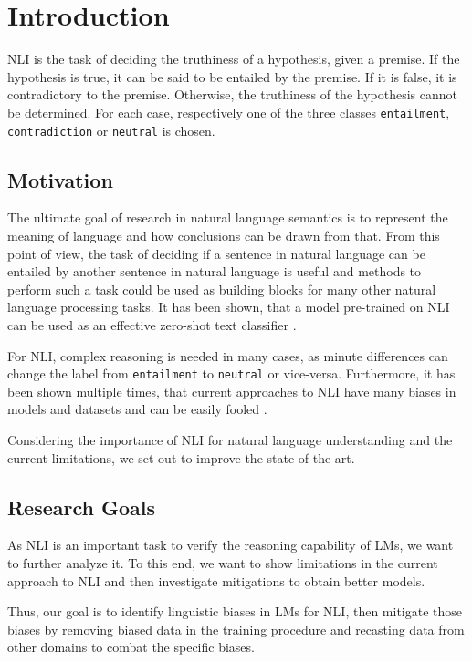 \section{Introduction}


\ac{NLI} is the task of deciding the truthiness of a hypothesis, given a premise. If the hypothesis is true, it can be said to be entailed by the premise. If it is false, it is contradictory to the premise. Otherwise, the truthiness of the hypothesis cannot be determined. For each case, respectively one of the three classes \texttt{entailment}, \texttt{contradiction} or \texttt{neutral} is chosen.

\subsection{Motivation}
The ultimate goal of research in natural language semantics is to represent the meaning of language and how conclusions can be drawn from that. From this point of view, the task of deciding if a sentence in natural language can be entailed by another sentence in natural language is useful and methods to perform such a task could be used as building blocks for many other natural language processing tasks. It has been shown, that a model pre-trained on \ac{NLI} can be used as an effective zero-shot text classifier \cite{yin-etal-2019-benchmarking}.

For \ac{NLI}, complex reasoning is needed in many cases, as minute differences can change the label from \texttt{entailment} to \texttt{neutral} or vice-versa. Furthermore, it has been shown multiple times, that current approaches to \ac{NLI} have many biases in models and datasets and can be easily fooled \cite{hyponly,gururangan-etal-2018-annotation,glockner-etal-2018-breaking}.

Considering the importance of \ac{NLI} for natural language understanding and the current limitations, we set out to improve the state of the art.
\subsection{Research Goals}
As \ac{NLI} is an important task to verify the reasoning capability of \acp{LM}, we want to further analyze it. To this end, we want to show limitations in the current approach to \ac{NLI} and then investigate mitigations to obtain better models.

Thus, our goal is to identify linguistic biases in \acp{LM} for \ac{NLI}, then mitigate those biases by removing biased data in the training procedure and recasting data from other domains to combat the specific biases.
\vspace{1em}

